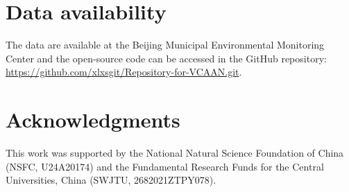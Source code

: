 \documentclass[3p,11pt,authoryear]{elsarticle}
\begin{document}
\section*{Data availability}
The data are available at the Beijing Municipal Environmental Monitoring Center and the open-source code can be accessed in the GitHub repository: \href{https://github.com/xlxsgit/Repository-for-VCAAN.git}{https://github.com/xlxsgit/Repository-for-VCAAN.git}. 

\section*{Acknowledgments}
This work was supported by the National Natural Science Foundation of China (NSFC, U24A20174) and the Fundamental Research Funds for the Central Universities, China (SWJTU, 2682021ZTPY078). 



\end{document}
